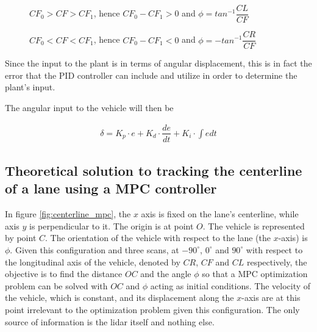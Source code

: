 \documentclass[oneside,12pt]{article}
\begin{document}
    \begin{figure}[H]\centering
      \scalebox{1}{}
      \caption{$CF_0 > CF > CF_1$, hence $CF_0 - CF_1 > 0$ and $\phi = tan^{-1} \dfrac{CL}{CF}$}
      \label{fig:range_diff_positive}
    \end{figure}

    \begin{figure}[H]\centering
      \scalebox{1}{}
      \caption{$CF_0 < CF < CF_1$, hence $CF_0 - CF_1 < 0$ and $\phi = -tan^{-1} \dfrac{CR}{CF}$}
      \label{fig:range_diff_negative}
    \end{figure}


    Since the input to the plant is in terms of angular displacement, this
    is in fact the error that the PID controller can include and utilize in
    order to determine the plant's input.

    The angular input to the vehicle will then be

    \begin{align}
      \delta = K_p \cdot e + K_d \cdot \dfrac{de}{dt} + K_i \cdot \int e dt
    \end{align}






















  \subsection{Theoretical solution to tracking the centerline of a lane using
    a MPC controller}


    In figure \ref{fig:centerline_mpc}, the $x$ axis is fixed on the lane's
    centerline, while axis $y$ is perpendicular to it. The origin is at point
    $O$. The vehicle is represented by point $C$. The orientation of the vehicle
    with respect to the lane (the $x$-axis) is $\phi$. Given this configuration
    and three scans, at $-90^{\circ}$, $0^{\circ}$ and $90^{\circ}$ with
    respect to the longitudinal axis of the vehicle, denoted by $CR$, $CF$ and
    $CL$ respectively, the objective is to find the distance $OC$ and the angle
    $\phi$ so that a MPC optimization problem can be solved with $OC$ and $\phi$
    acting as initial conditions. The velocity of the vehicle,
    which is constant, and its displacement along the $x$-axis are at this point
    irrelevant to the optimization problem given this configuration. The only
    source of information is the lidar itself and nothing else.
\end{document}
